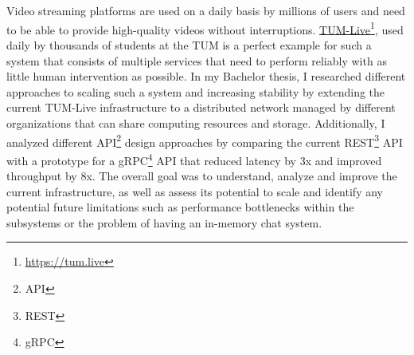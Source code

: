 \chapter{\abstractname}

Video streaming platforms are used on a daily basis by millions of users and need to be able to provide high-quality videos without interruptions. \href{https://tum.live}{TUM-Live}\footnote{\url{https://tum.live}}, used daily by thousands of students at the \ac{TUM} is a perfect example for such a system that consists of multiple services that need to perform reliably with as little human intervention as possible.
In my Bachelor thesis, I researched different approaches to scaling such a system and increasing stability by extending the current TUM-Live infrastructure to a distributed network managed by different organizations that can share computing resources and storage. Additionally, I analyzed different API\footnote{\ac{API}} design approaches by comparing the current REST\footnote{\ac{REST}} \ac{API} with a prototype for a gRPC\footnote{\ac{gRPC}} \ac{API} that reduced latency by 3x and improved throughput by 8x. The overall goal was to understand, analyze and improve the current infrastructure, as well as assess its potential to scale and identify any potential future limitations such as performance bottlenecks within the subsystems or the problem of having an in-memory chat system.
